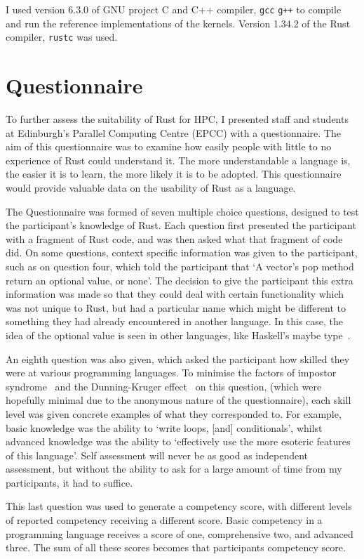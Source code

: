 I used version 6.3.0 of GNU project C  and C++ compiler, \texttt{gcc} \texttt{g++} to compile and run the reference implementations of the kernels. Version 1.34.2 of the Rust compiler, \texttt{rustc} was used.
\section{Questionnaire}
To further assess the suitability of Rust for HPC, I presented staff and students at Edinburgh's Parallel Computing Centre (EPCC) with a questionnaire. The aim of this questionnaire was to examine how easily people with little to no experience of Rust could understand it. The more understandable a language is, the easier it is to learn, the more likely it is to be adopted. This questionnaire would provide valuable data on the usability of Rust as a language.

The Questionnaire was formed of seven multiple choice questions, designed to test the participant's knowledge of Rust. Each question first presented the participant with a fragment of Rust code, and was then asked what that fragment of code did. On some questions, context specific information was given to the participant, such as on question four, which told the participant that `A vector's pop method return an optional value, or none'. The decision to give the participant this extra information was made so that they could deal with certain functionality which was not unique to Rust, but had a particular name which might be different to something they had already encountered in another language. In this case, the idea of the optional value is seen in other languages, like Haskell's maybe type~\cite{HaskellMaybe}.

An eighth question was also given, which asked the participant how skilled they were at various programming languages.
To minimise the factors of impostor syndrome~\cite{langford1993} and the Dunning-Kruger effect~\cite{kruger1999} on this question, (which were hopefully minimal due to the anonymous nature of the questionnaire), each skill level was given concrete examples of what they corresponded to. For example, basic knowledge was the ability to `write loops, [and] conditionals', whilst advanced knowledge was the ability to `effectively use the more esoteric features of this language'. Self assessment will never be as good as independent assessment, but without the ability to ask for a large amount of time from my participants, it had to suffice.

This last question was used to generate a competency score, with different levels of reported competency receiving a different score. Basic competency in a programming language receives a score of one, comprehensive two, and advanced three. The sum of all these scores becomes that participants competency score.

